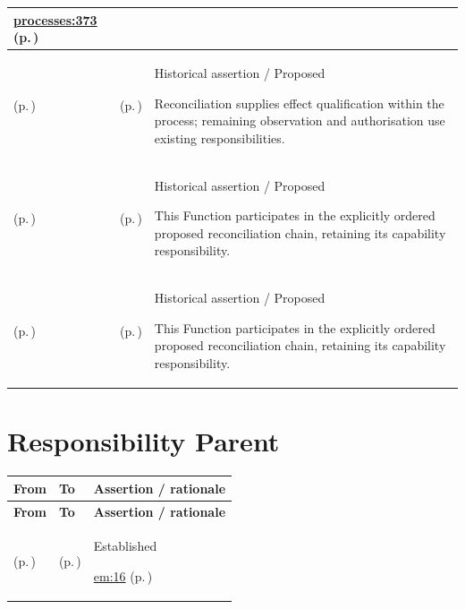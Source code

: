 \begin{longtable}{|>{\raggedright\arraybackslash}p{0.27\TableWidth}|>{\raggedright\arraybackslash}p{0.27\TableWidth}|>{\raggedright\arraybackslash}p{0.46\TableWidth}|}
 \hyperref[rad:processes:369]{processes:373} (p.\,\pageref{rad:processes:369})\\\hline
\nameref{process:indeterminate-activity-outcome-reconciliation-process} (p.\,\pageref{process:indeterminate-activity-outcome-reconciliation-process}) & \nameref{function:reconcile-indeterminate-activity-effects} (p.\,\pageref{function:reconcile-indeterminate-activity-effects}) & Historical assertion / Proposed

Reconciliation supplies effect qualification within the process; remaining observation and authorisation use existing responsibilities.\\\hline
\nameref{process:indeterminate-activity-outcome-reconciliation-process} (p.\,\pageref{process:indeterminate-activity-outcome-reconciliation-process}) & \nameref{function:establish-activity-effect-observation-basis} (p.\,\pageref{function:establish-activity-effect-observation-basis}) & Historical assertion / Proposed

This Function participates in the explicitly ordered proposed reconciliation chain, retaining its capability responsibility.\\\hline
\nameref{process:indeterminate-activity-outcome-reconciliation-process} (p.\,\pageref{process:indeterminate-activity-outcome-reconciliation-process}) & \nameref{function:determine-reconciled-activity-continuation} (p.\,\pageref{function:determine-reconciled-activity-continuation}) & Historical assertion / Proposed

This Function participates in the explicitly ordered proposed reconciliation chain, retaining its capability responsibility.\\\hline
\end{longtable}\endgroup
\section{Responsibility Parent}
\begingroup\small\setlength{\TableWidth}{\dimexpr\linewidth-6\tabcolsep-4\arrayrulewidth\relax}
\begin{longtable}{|>{\raggedright\arraybackslash}p{0.27\TableWidth}|>{\raggedright\arraybackslash}p{0.27\TableWidth}|>{\raggedright\arraybackslash}p{0.46\TableWidth}|}
\hline\rowcolor{TableHead}\textbf{From} & \textbf{To} & \textbf{Assertion / rationale}\\\hline\endfirsthead
\hline\rowcolor{TableHead}\textbf{From} & \textbf{To} & \textbf{Assertion / rationale}\\\hline\endhead
\hline\endfoot
\nameref{cap:bec-client-administration} (p.\,\pageref{cap:bec-client-administration}) & \nameref{cap:bec-person-identity} (p.\,\pageref{cap:bec-person-identity}) & Established

 \hyperref[rad:em:16]{em:16} (p.\,\pageref{rad:em:16})\\\hline
\end{longtable}\endgroup
